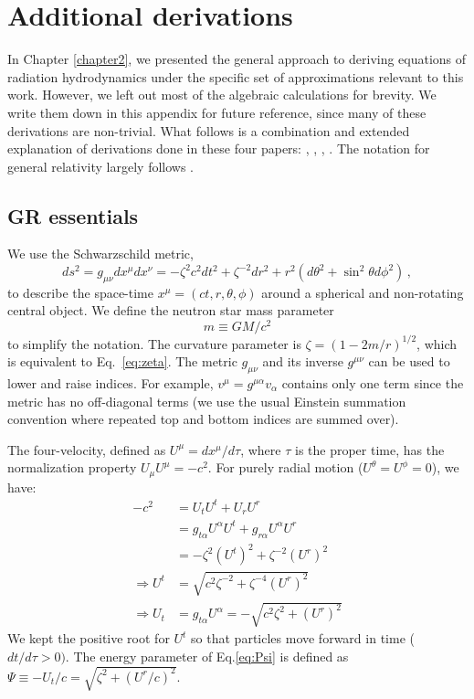 \documentclass[../main.tex]{subfiles}
\begin{document}
\chapter{Additional derivations}\label{appendix_derivations}
In Chapter \ref{chapter2}, we presented the general approach to deriving equations of radiation hydrodynamics under the specific set of approximations relevant to this work. However, we left out most of the algebraic calculations for brevity. We write them down in this appendix for future reference, since many of these derivations are non-trivial. What follows is a combination and extended explanation of derivations done in these four papers: \citet{Park1993}, \citet{Park2006}, \citet{Thorne1981}, \citet{Flammang1982}. The notation for general relativity largely follows \citet{Carroll2004}.


\section*{GR essentials}
We use the Schwarzschild metric,
\begin{equation}
    ds^2=g_{\mu\nu}dx^\mu dx^\nu=-\zeta^2c^2 dt^2+\zeta^{-2}dr^2 +r^2(d\theta^2+\sin^2\theta d\phi^2)\,,
\end{equation}
to describe the space-time $x^\mu=(ct,r,\theta,\phi)$ around a spherical and non-rotating central object. We define the neutron star mass parameter
\begin{equation}
    m\equiv GM/c^2
\end{equation}
to simplify the notation. The curvature parameter is $\zeta=(1-2m/r)^{1/2}$, which is equivalent to Eq.~\eqref{eq:zeta}.
The metric $g_{\mu\nu}$ and its inverse $g^{\mu\nu}$ can be used to lower and raise indices. For example, $v^\mu=g^{\mu\alpha}v_\alpha$ contains only one term since the metric has no off-diagonal terms (we use the usual Einstein summation convention where repeated top and bottom indices are summed over).

The four-velocity, defined as $U^\mu=dx^\mu/d\tau$, where $\tau$ is the proper time, has the normalization property $U_\mu U^\mu=-c^2$.   For purely radial motion ($U^\theta=U^\phi=0$), we have:
\begin{align}
    -c^2&=U_tU^t+U_rU^r\nonumber\\
    &=g_{t\alpha}U^\alpha U^t+g_{r\alpha}U^\alpha U^r\nonumber\\
    &=-\zeta^2(U^t)^2+\zeta^{-2}(U^r)^2\nonumber\\
    \Rightarrow U^t&=\sqrt{c^2\zeta^{-2}+\zeta^{-4}(U^r)^2}\nonumber\\
    \Rightarrow U_t&=g_{t\alpha}U^\alpha=-\sqrt{c^2\zeta^2+(U^r)^2}
\end{align}
We kept the positive root for $U^t$ so that particles move forward in time ($dt/d\tau>0)$.  The energy parameter of Eq.\ref{eq:Psi} is defined as $\Psi\equiv -U_t/c=\sqrt{\zeta^2+(U^r/c)^2}$.
\end{document}
